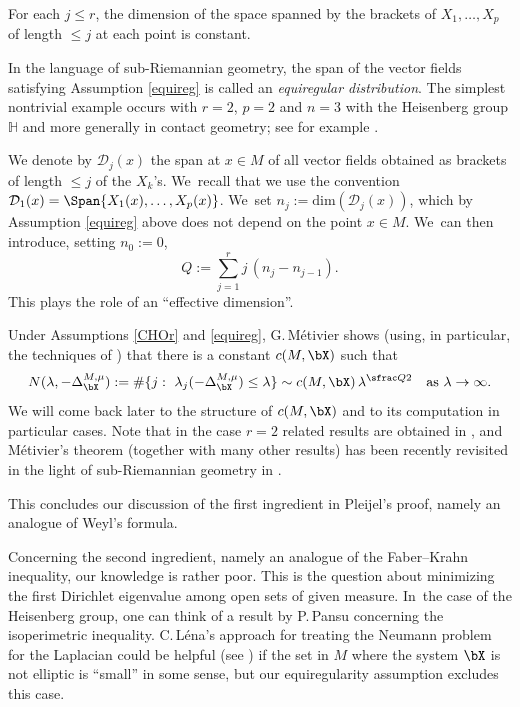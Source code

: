 \begin{assumption}\label{equireg}
For each $j\leq r$, the dimension of the space spanned by the brackets of $X_1,\ldots,X_p$ of length $\leq j$ at each point is constant.
\end{assumption}

In the language of sub-Riemannian geometry, the span of the vector fields satisfying Assumption \eqref{equireg} is called an \emph{equiregular distribution}. The simplest nontrivial example occurs with $r=2$, $p=2$ and $n=3$ with the Heisenberg group $\mathbb H$ and more generally in contact geometry; see for example \cite{AgBaBo,ArRi}.

We denote by $\mathcal{D}_j(x)$ the span at $x\in M$ of all vector fields obtained as brackets of length $\leq j$ of the $X_k$'s. We~recall that we use the convention $\mathcal D_1(x)=\allowbreak\Span\{X_1(x),\ldots,X_p(x)\}$. We~set $n_j :=\text{dim}(\mathcal{D}_j(x))$, which by Assumption \ref{equireg} above does not depend on the point $x\in M$. We~can then introduce, setting $n_0:=0$,\vspace*{-5pt}\enlargethispage{.5\baselineskip}
\begin{equation}\label{eq:defQ}
Q:= \sum_{j=1}^r j \,(n_j-n_{j-1}).
\end{equation}
This plays the role of an ``effective dimension''.

Under Assumptions \ref{CHOr} and \ref{equireg}, G.\,Métivier shows (using, in particular, the techniques of \cite{RS,Rot}) that there is a constant $c(M,\bX)$ such that\vspace*{-3pt}
\begin{equation}\label{MetForm1}
N(\lambda,-\Delta_\bX^{M,\mu}):= \# \{j:\ \lambda_j (-\Delta_\bX^{M,\mu}) \leq \lambda\} \sim c (M,\bX) \,\lambda^{\sfrac Q2}
\quad\text{as}\ \lambda\to\infty.
\end{equation}
We will come back later to the structure of $c (M,\bX)$ and to its computation in particular cases. Note that in the case $r=2$ related results are obtained in \cite{MS1,MS2,Me,Mo}, and Métivier's theorem (together with many other results) has been recently revisited in the light of sub-Riemannian geometry in \cite{CHT0,CHT,CHT1}.

This concludes our discussion of the first ingredient in Pleijel's proof, namely an analogue of Weyl's formula.

Concerning the second ingredient, namely an analogue of the Faber--Krahn inequality, our knowledge is rather poor. This is the question about minimizing the first Dirichlet eigenvalue among open sets of given measure. In~the case of the Heisenberg group, one can think of a result by P.\,Pansu \cite{Pa} concerning the isoperimetric inequality. C.\,Léna's approach \cite{Le} for treating the Neumann problem for the Laplacian could be helpful (see \cite{HS}) if the set in $M$ where the system $\bX$ is not elliptic is ``small'' in some sense, but our equiregularity assumption excludes this case.


